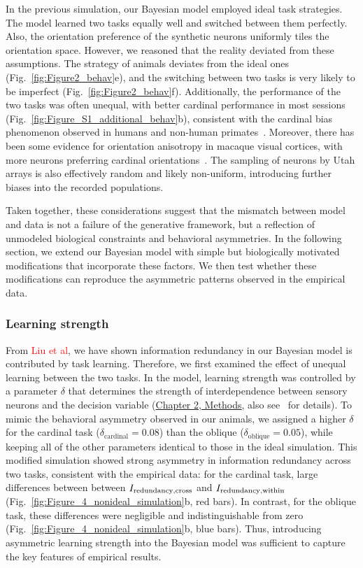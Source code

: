\documentclass[lineno,pdflatex,sn-basic]{sn-jnl}%
\newcommand{\Ideltawithin}{I_{\rm redundancy,within}}
\newcommand{\Ideltacross}{I_{\rm redundancy,cross}}
\theoremstyle{thmstyleone}%
\theoremstyle{thmstyletwo}%
\theoremstyle{thmstylethree}%
\begin{document}
In the previous simulation, our Bayesian model employed ideal task strategies. The model learned two tasks equally well and switched between them perfectly. Also, the orientation preference of the synthetic neurons uniformly tiles the orientation space. However, we reasoned that the reality deviated from these assumptions.
The strategy of animals deviates from the ideal ones (Fig.~\ref{fig:Figure2_behav}e), and the switching between two tasks is very likely to be imperfect (Fig.~\ref{fig:Figure2_behav}f). Additionally, the performance of the two tasks was often unequal, with better cardinal performance in most sessions (Fig.~\ref{fig:Figure_S1_additional_behav}b), consistent with the cardinal bias phenomenon observed in humans and non-human primates~\citep{appelle1972perception, nasr2012cardinal}. Moreover, there has been some evidence for orientation anisotropy in macaque visual cortices, with more neurons preferring cardinal orientations~\citep{mansfield1974neural, nasr2012cardinal, fang2022orientation}. The sampling of neurons by Utah arrays is also effectively random and likely non-uniform, introducing further biases into the recorded populations.

Taken together, these considerations suggest that the mismatch between model and data is not a failure of the generative framework, but a reflection of unmodeled biological constraints and behavioral asymmetries. In the following section, we extend our Bayesian model with simple but biologically motivated modifications that incorporate these factors. We then test whether these modifications can reproduce the asymmetric patterns observed in the empirical data.


\subsubsection{Learning strength} From \textcolor{red}{Liu et al}, we have shown information redundancy in our Bayesian model is contributed by task learning. Therefore, we first examined the effect of unequal learning between the two tasks. In the model, learning strength was controlled by a parameter $\delta$ that determines the strength of interdependence between sensory neurons and the decision variable (\hyperref[sec_ch1:Hierarchical Bayesian inference model]{Chapter 2, Methods}, also see~\citet{haefner2016perceptual} for details). To mimic the behavioral asymmetry observed in our animals, we assigned a higher $\delta$ for the cardinal task ($\delta_\textrm{cardinal} = 0.08$) than the oblique ($\delta_\textrm{oblique} = 0.05$), while keeping all of the other parameters identical to those in the ideal simulation.
This modified simulation showed strong asymmetry in information redundancy across two tasks, consistent with the empirical data: for the cardinal task, large differences between between $\Ideltacross$ and $\Ideltawithin$ (Fig.~\ref{fig:Figure_4_nonideal_simulation}b, red bars). In contrast, for the oblique task, these differences were negligible and indistinguishable from zero (Fig.~\ref{fig:Figure_4_nonideal_simulation}b, blue bars). Thus, introducing asymmetric learning strength into the Bayesian model was sufficient to capture the key features of empirical results.
\end{document}
